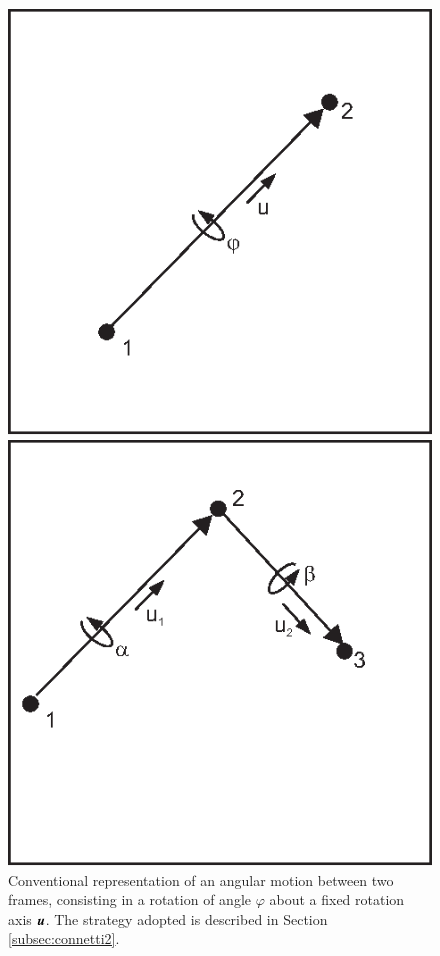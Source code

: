 \begin{figure}[tbp]
    \begin{minipage}[t]{0.49\textwidth}
        \centering
        \includegraphics{figures/connetti2}
        \caption{Conventional representation of an angular motion between two frames, consisting in a rotation of angle $\varphi$ about a fixed rotation axis ${\boldsymbol{u}}$. The strategy adopted is described in Section \ref{subsec:connetti2}.}
        \label{fig:connetti2}
    \end{minipage}
    \hfill
    \begin{minipage}[t]{0.49\textwidth}
        \centering
        \includegraphics{figures/connetti3}

\end{minipage}
\end{figure}
